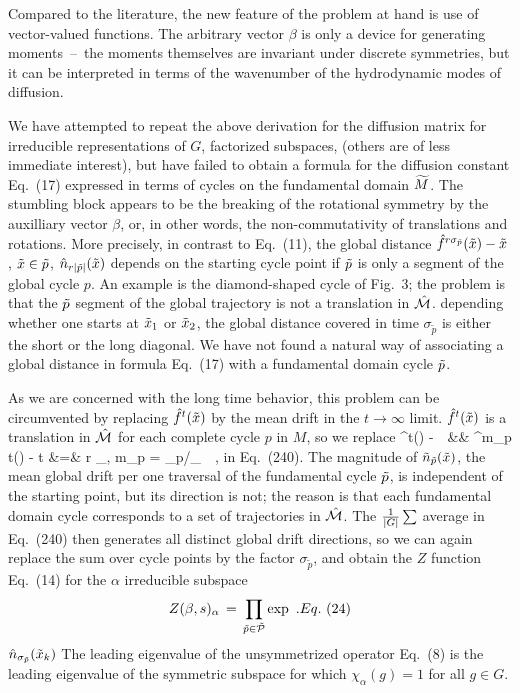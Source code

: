 Compared to the literature,
the new feature
of the problem at hand is use of vector-valued functions.
The arbitrary vector $\beta$ is only a device
for generating moments~--~the moments themselves are
invariant under discrete symmetries,
but it can be interpreted in terms of the wavenumber of
the hydrodynamic modes of diffusion.

We have attempted to repeat the above
derivation for the diffusion matrix for irreducible representations of $G$,
 factorized subspaces, (others are of less immediate interest),
but have failed to obtain a
formula for the diffusion constant Eq.~(17) expressed in terms
of cycles on the fundamental domain ${\widetilde M}$. The stumbling block
appears to be
 the breaking of the rotational symmetry by
 the auxilliary vector $\beta$, or, in other words,
the non-commutativity of translations and rotations.
More precisely,
in contrast to Eq.~(11), the global distance
$ \hat f^{r \sigma_{\tilde{p}}} (\tilde x{}) - \tilde x{} $, $\tilde x{} \in {\tilde p}$,
 $ \hat n_{r |\tilde p|}(\tilde x{}) $
depends on the starting cycle point if
${\tilde p}$ is only a segment of the global cycle $p$. An
example is the diamond-shaped cycle of Fig.~3;
the problem is that the ${\tilde p}$ segment of
the global trajectory is not a translation in $\hat {{\cal M}}$.
depending whether one starts at $\tilde x_1$ or $\tilde x_2$, the global
distance covered in time $\sigma_{\tilde{p}}$ is either the short or the
long diagonal. We have not found a natural way of associating
a global distance in  formula Eq.~(17) with a fundamental domain
cycle ${\tilde p}$.


 As we are concerned with the long time behavior,
 this problem can be circumvented
 by replacing $ \hat f^t(\tilde x{}) $ by the mean
 drift in the $t \rightarrow \infty$ limit.
 $ \hat f^t(\tilde x{}) $ is a translation in $\hat {{\cal M}}$ for each
 complete cycle $p$ in $M$, so we replace
 \bea
 \hf^t(\tx{\tpk}) - \tx{\tpk}
 \,\Longrightarrow \,
 &&
 { { \hf^{m_p t}(\tx{\tpk}) - \tx{\tpk} }
 }
 \continue
t &=& r \sigma_{}, \quad m_p = \sigma_p/\sigma_{} \quad \tx \in \tp \,\, ,
 \eea
 in Eq.~(240).
 The magnitude of ${\tilde n}_{{\tilde p}}(\tilde x{})$, the mean
 global drift per one traversal of the fundamental cycle ${\tilde p}$, is
 independent of the starting point, but its direction is not; the
 reason is that each fundamental domain cycle corresponds to a set of
 trajectories in $\hat {{\cal M}}$.
 The ${1 \over {|G|}} \sum$ average in
 Eq.~(240) then generates all distinct global drift
 directions, so we can again replace the
 sum over cycle points by the factor $\sigma_{\tilde{p}}$, and obtain the
 $Z$ function Eq.~(14) for the $\alpha $ irreducible subspace
 $$
 Z(\beta,s)_\alpha\,=\,\prod_{{\tilde p} \in \tilde{\cal{P}} } \exp
 \,\, .
 Eq.~(24)
 $$
 $\hat n_{\sigma_{\tilde{p}}}(\tilde x_k)$
 The leading eigenvalue of the
unsymmetrized
 operator Eq.~(8) is
 the leading eigenvalue of the symmetric subspace for which
 $\chi_\alpha(g)=1$ for all $g \in G$.



